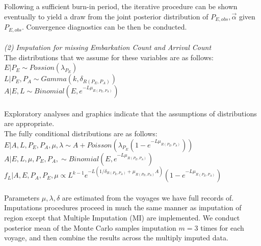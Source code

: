 \documentclass[preprint,12pt]{elsarticle}
\begin{document}
Following a sufficient burn-in period, the iterative procedure can be shown eventually to yield a draw from the joint posterior distribution of $P_{E, obs},\vec{\alpha}$ given $P_{E, obs}$. Convergence diagnostics can be then be conducted.\\
\\
\textit{(2) Imputation for missing Embarkation Count and Arrival Count}\\
\indent
The distributions that we assume for these variables are as follows:\\
\indent
$E|P_E \sim Possion(\lambda_{P_E})$\\
\indent
$L|P_E, P_A \sim Gamma(k, \delta_{R(P_E, P_A)})$\\
\indent
$A|E, L \sim Binomial(E, e^{-L\mu_{R(P_E, P_A)}})$\\
\\
\indent
Exploratory analyses and graphics indicate that the assumptions of distributions are appropriate.\\

The fully conditional distributions are as follows:\\
\indent
$E|A, L, P_E, P_A, \mu, \lambda \sim A+Poisson(\lambda_{P_E}(1-e^{-L\mu_{R(P_E, P_A)}}))$\\
\indent
$A|E, L,  \mu, P_E, P_A, \sim Binomial(E,e^{-L\mu_{R(P_E, P_A)}} )$\\
\indent
$f_L|A, E, P_A, P_E, \mu \propto  L^{k-1} e^{-L(1/\delta_{R(P_E, P_A)}+\mu_{R(P_E, P_A)}A)}(1-e^{-L\mu_{R(P_E, P_A)}})$\\
\\
\indent
Parameters $\mu, \lambda, \delta$ are estimated from the voyages we have full records of. Imputations procedures proceed in much the same manner as imputation of region except that Multiple Imputation (MI) are implemented. We conduct posterior mean of the Monte Carlo samples imputation $m=3$ times for each voyage, and then combine the results across the multiply imputed data.\\
\end{document}
